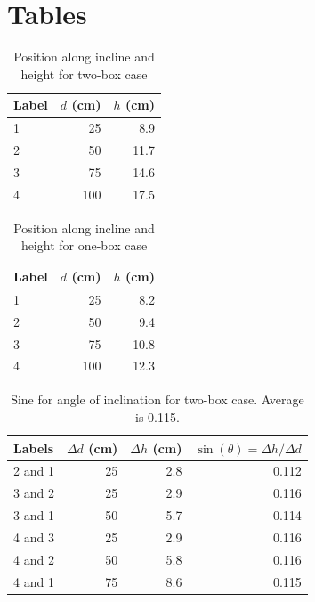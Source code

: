 \section{Tables}
\begin{table}[ht]
    \centering
    \begin{tabular}{|l|r|r|}
        \hline
        Label & $d$ (cm) & $h$ (cm) \\
        \hline
        1 & 25 & 8.9 \\
        2 & 50 & 11.7 \\
        3 & 75 & 14.6 \\
        4 & 100 & 17.5 \\
        \hline
    \end{tabular}
    \caption{Position along incline and height for two-box case}
    \label{table:02.height.2}
\end{table}
\begin{table}[ht]
    \centering
    \begin{tabular}{|l|r|r|}
        \hline
        Label & $d$ (cm) & $h$ (cm) \\
        \hline
        1 & 25 & 8.2 \\
        2 & 50 & 9.4 \\
        3 & 75 & 10.8 \\
        4 & 100 & 12.3 \\
        \hline
    \end{tabular}
    \caption{Position along incline and height for one-box case}
    \label{table:02.height.1}
\end{table}
\begin{table}[ht]
    \centering
    \begin{tabular}{|l|r|r|r|}
        \hline
        Labels & $\Delta d$ (cm) & $\Delta h$ (cm) & $\sin(\theta) = \Delta h / \Delta d$ \\
        \hline
        2 and 1 & 25 & 2.8 & 0.112 \\
        3 and 2 & 25 & 2.9 & 0.116 \\
        3 and 1 & 50 & 5.7 & 0.114 \\
        4 and 3 & 25 & 2.9 & 0.116 \\
        4 and 2 & 50 & 5.8 & 0.116 \\
        4 and 1 & 75 & 8.6 & 0.115 \\
        \hline
    \end{tabular}
    \caption{Sine for angle of inclination for two-box case. Average is 0.115.}
    \label{table:02.sine.2}
\end{table}
